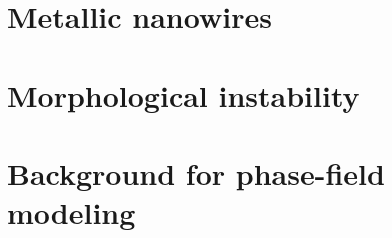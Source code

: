 \section{Metallic nanowires}
    
\section{Morphological instability}
    
\section{Background for phase-field modeling}\label{chap:1_3-phase-field}
    